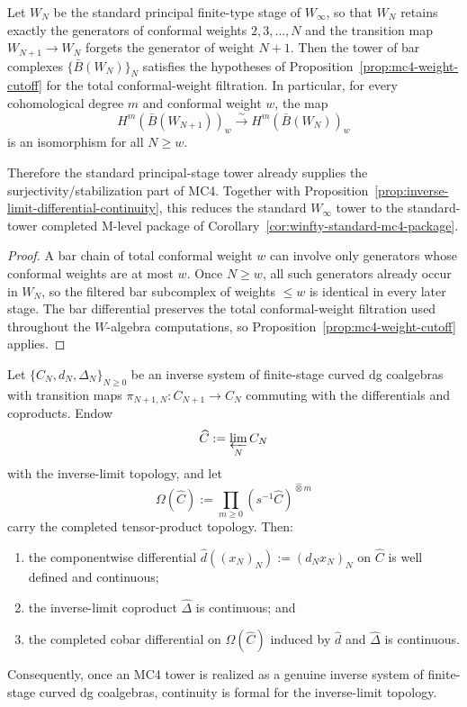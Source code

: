 \begin{corollary}
\label{cor:winfty-weight-cutoff}
Let $W_N$ be the standard principal finite-type stage of $W_\infty$,
so that $W_N$ retains exactly the generators of conformal weights
$2,3,\dots,N$ and the transition map $W_{N+1}\to W_N$ forgets the
generator of weight $N+1$.  Then the tower of bar complexes
$\{\bar B(W_N)\}_N$ satisfies the hypotheses of
Proposition~\ref{prop:mc4-weight-cutoff} for the total conformal-weight
filtration.  In particular, for every cohomological degree $m$ and
conformal weight $w$, the map
\[
H^m(\bar B(W_{N+1}))_w \xrightarrow{\sim} H^m(\bar B(W_N))_w
\]
is an isomorphism for all $N \ge w$.

Therefore the standard principal-stage tower already supplies the
surjectivity/stabilization part of MC4.  Together with
Proposition~\ref{prop:inverse-limit-differential-continuity}, this
reduces the standard $W_\infty$ tower to the standard-tower completed
M-level package of Corollary~\ref{cor:winfty-standard-mc4-package}.
\end{corollary}

\begin{proof}
A bar chain of total conformal weight $w$ can involve only generators
whose conformal weights are at most $w$.  Once $N \ge w$, all such
generators already occur in $W_N$, so the filtered bar subcomplex of
weights $\le w$ is identical in every later stage.  The bar
differential preserves the total conformal-weight filtration used
throughout the \(W\)-algebra computations, so
Proposition~\ref{prop:mc4-weight-cutoff} applies.
\end{proof}

\begin{proposition}
\label{prop:inverse-limit-differential-continuity}
Let $\{C_N,d_N,\Delta_N\}_{N \ge 0}$ be an inverse system of finite-stage
curved dg coalgebras with transition maps
$\pi_{N+1,N}\colon C_{N+1}\to C_N$ commuting with the differentials and
coproducts.  Endow
\[
\widehat C := \varprojlim_N C_N
\]
with the inverse-limit topology, and let
\[
\Omega(\widehat C)
:=
\prod_{m \ge 0} (s^{-1}\widehat C)^{\widehat\otimes m}
\]
carry the completed tensor-product topology.  Then:
\begin{enumerate}
\item the componentwise differential
  $\widehat d((x_N)_N):=(d_Nx_N)_N$ on $\widehat C$ is well defined and
  continuous;
\item the inverse-limit coproduct $\widehat\Delta$ is continuous; and
\item the completed cobar differential on $\Omega(\widehat C)$ induced
  by $\widehat d$ and $\widehat\Delta$ is continuous.
\end{enumerate}
Consequently, once an MC4 tower is realized as a genuine inverse system
of finite-stage curved dg coalgebras, continuity is formal for the
inverse-limit topology.
\end{proposition}


